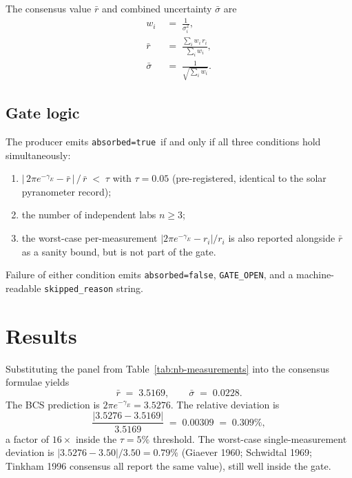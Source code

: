 \documentclass[11pt,a4paper]{article}
\newcommand{\absorbedtrue}{\textcolor{honestgreen}{\texttt{absorbed=true}}}
\newcommand{\absorbedfalse}{\textcolor{honestred}{\texttt{absorbed=false}}}
\newcommand{\gateopen}{\texttt{GATE\_OPEN}}
\begin{document}
The consensus value \(\bar{r}\) and combined uncertainty \(\bar{\sigma}\) are
\begin{align}
w_{i} \;&=\; \frac{1}{\sigma_{i}^{2}}, \\
\bar{r} \;&=\; \frac{\sum_{i} w_{i}\, r_{i}}{\sum_{i} w_{i}}, \\
\bar{\sigma} \;&=\; \frac{1}{\sqrt{\sum_{i} w_{i}}}.
\end{align}

\subsection{Gate logic}

The producer emits \absorbedtrue\ if and only if all three
conditions hold simultaneously:
\begin{enumerate}
\item \(\bigl|\,2\pi e^{-\gamma_{E}} - \bar{r}\,\bigr| \,/\, \bar{r}
  \;<\; \tau\) with \(\tau = 0.05\) (pre-registered, identical to
  the solar pyranometer record);
\item the number of independent labs \(n \ge 3\);
\item the worst-case per-measurement \(|2\pi e^{-\gamma_{E}} - r_{i}|/r_{i}\)
  is also reported alongside \(\bar{r}\) as a sanity bound, but is
  not part of the gate.
\end{enumerate}

Failure of either condition emits \absorbedfalse, \gateopen, and a
machine-readable \texttt{skipped\_reason} string.

\section{Results}
\label{sec:results}

Substituting the panel from Table~\ref{tab:nb-measurements} into the
consensus formulae yields
\begin{equation}
\bar{r} \;=\; 3.5169, \qquad \bar{\sigma} \;=\; 0.0228.
\end{equation}
The BCS prediction is \(2\pi e^{-\gamma_{E}} = 3.5276\). The relative
deviation is
\begin{equation}
\frac{|3.5276 - 3.5169|}{3.5169} \;=\; 0.00309 \;=\; 0.309\%,
\end{equation}
a factor of \(16\times\) inside the \(\tau = 5\%\) threshold. The
worst-case single-measurement deviation is \(|3.5276 - 3.50|/3.50
= 0.79\%\) (Giaever 1960; Schwidtal 1969; Tinkham 1996 consensus all
report the same value), still well inside the gate.
\end{document}
